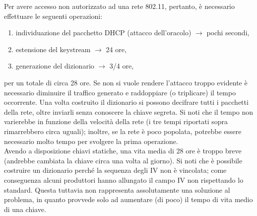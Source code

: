 Per avere accesso non autorizzato ad una rete 802.11, pertanto, è necessario effettuare le seguenti operazioni:
\begin{enumerate}
	\item individuazione del pacchetto DHCP (attacco dell'oracolo) $\longrightarrow$ pochi secondi,
	\item estensione del keystream $\longrightarrow$ 24 ore,
	\item generazione del dizionario $\longrightarrow$ 3/4 ore,
\end{enumerate}
per un totale di circa 28 ore. Se non si vuole rendere l'attacco troppo evidente è necessario diminuire il traffico generato e raddoppiare (o triplicare) il tempo occorrente. Una volta costruito il dizionario si possono decifrare tutti i
pacchetti della rete, oltre inviarli senza conoscere la chiave segreta. Si noti che il tempo non varierebbe in funzione della velocità della rete (i tre tempi riportati sopra rimarrebbero circa uguali); inoltre, se la rete è poco popolata, potrebbe essere necessario molto tempo per svolgere la prima operazione.\\
Avendo a disposizione chiavi statiche, una vita media di 28 ore è troppo breve (andrebbe cambiata la chiave circa una volta al giorno). Si noti che è possibile costruire un dizionario perché la sequenza degli IV non è vincolata; come conseguenza alcuni produttori hanno allungato il campo IV non rispettando lo standard. Questa tuttavia non rappresenta assolutamente una soluzione al problema, in quanto provvede solo ad aumentare (di poco) il tempo di vita medio di una chiave.

